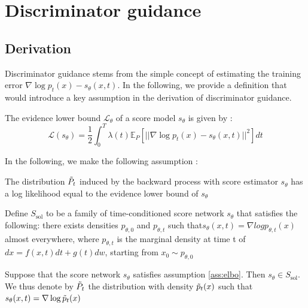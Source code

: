 \section{Discriminator guidance}\label{sec:dg:sec1}
\subsection{Derivation}
Discriminator guidance stems from the simple concept of estimating the training error $\nabla \log p_{t}(x) - s_{\theta}(x,t)$.
In the following, we provide a definition that would introduce a key assumption in the derivation of discriminator guidance.
\begin{definition}
    The evidence lower bound $\mathcal{L}_{\theta}$ of a score model $s_{\theta}$ is given by :
    \begin{equation}
            \mathcal{L}(s_{\theta}) = \frac{1}{2}\int_{0}^{T} \lambda(t) \mathbb{E}_{P}\left[||\nabla \log p_{t}(x) - s_{\theta}(x,t) ||^{2}  \right]dt
    \end{equation}
\end{definition}


In the following, we make the following assumption : 
\begin{assumption}\label{ass:elbo}
    The distribution  $\Tilde{P}_{t}$ induced by the backward process with score estimator $s_{\theta}$ has a log likelihood equal to the evidence lower bound of $s_{\theta}$
\end{assumption}
Define $S_{\mathrm{sol}}$ to be a family of time-conditioned score network $s_{\theta}$ that satisfies the
following: there exists densities $p_{\theta,0}$ and $p_{\theta,t}$ such that$ s_{\theta}(x, t) = \nabla log p_{\theta,t}(x)$ almost everywhere, where $p_{\theta,t}$ is the marginal density at time t of $dx = f(x, t) dt + g(t) dw$, starting from $x_{0} \sim p_{\theta,0}$
\begin{theorem}\label{thm:conservativity_score}\citep{kim2023refininggenerativeprocessdiscriminator}
    Suppose that the score network $s_{\theta}$ satisfies assumption \ref{ass:elbo}. Then $s_{\theta} \in S_{\mathrm{sol}}$. We thus denote by $\Tilde{P}_{t}$ the distribution with density $\Tilde{p}_{t}(x)$ such that $s_{\theta}(x,t) = \nabla \log \Tilde{p}_{t}(x)$
\end{theorem}



